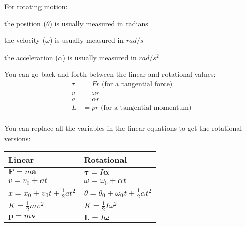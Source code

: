 \documentclass{exam}
\begin{document}
\vspace{.2 in}

For rotating motion:
\begin{itemize*}
\item the position ($\theta$) is usually measured in radians 
\item the velocity ($\omega$) is usually measured in $rad/s$
\item the acceleration ($\alpha$) is usually measured in $rad/s^2$
\end{itemize*}

You can go back and forth between the linear and rotational values:
\begin{align*}
  \tau &= Fr \text{ (for a tangential force)} \\
  v &= \omega r \\
  a &= \alpha r \\
  L &= p r \text{ (for a tangential momentum)} \\
\end{align*}

You can replace all the variables in the linear equations to get the rotational versions:

\vspace{.2 in}

\begin{tabular}{ll}
\toprule
Linear & Rotational \\
\midrule
$ \mathbf{F} = m \mathbf{a}$         & $\mathbf{\tau} = I \mathbf{\alpha}$               \\
$ v = v_0 + at$                      & $\omega = \omega_0 + \alpha t$  \\
$ x = x_0 + v_0t + \frac{1}{2}at^2$  & $\theta = \theta_0 + \omega_0 t + \frac{1}{2} \alpha t^2$ \\
$ K = \frac{1}{2} mv^2$              & $K = \frac{1}{2} I \omega^2$ \\
$ \mathbf{p} = m \mathbf{v}$         & $\mathbf{L} = I \mathbf{\omega}$ \\
\bottomrule
\end{tabular}
\end{document}
